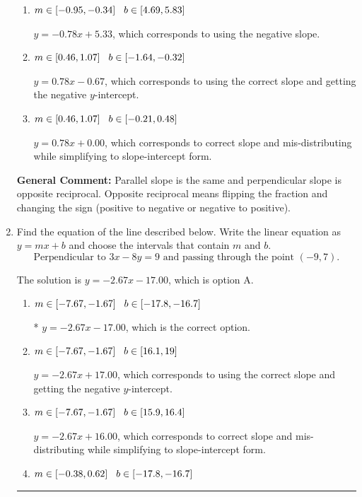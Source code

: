 \documentclass{extbook}[14pt]
\newcommand{\litem}[1]{\item #1

\rule{\textwidth}{0.4pt}}
\begin{document}
\begin{enumerate}
{\begin{enumerate}[label=\Alph*.]
 $y = 1.29x + 0.67$, which corresponds to using the reciprocal slope $(1/m)$.
\item \( m \in [-0.95, -0.34] \hspace*{3mm} b \in [4.69, 5.83] \)

 $y = -0.78x + 5.33$, which corresponds to using the negative slope.
\item \( m \in [0.46, 1.07] \hspace*{3mm} b \in [-1.64, -0.32] \)

 $y = 0.78x - 0.67$, which corresponds to using the correct slope and getting the negative $y$-intercept.
\item \( m \in [0.46, 1.07] \hspace*{3mm} b \in [-0.21, 0.48] \)

 $y = 0.78x + 0.00$, which corresponds to correct slope and mis-distributing while simplifying to slope-intercept form.
\end{enumerate}

\textbf{General Comment:} Parallel slope is the same and perpendicular slope is opposite reciprocal. Opposite reciprocal means flipping the fraction and changing the sign (positive to negative or negative to positive).
}
\litem{
Find the equation of the line described below. Write the linear equation as $ y=mx+b $ and choose the intervals that contain $m$ and $b$.
\[ \text{Perpendicular to } 3 x - 8 y = 9 \text{ and passing through the point } (-9, 7). \]

The solution is \( y = -2.67x - 17.00 \), which is option A.\begin{enumerate}[label=\Alph*.]
\item \( m \in [-7.67, -1.67] \hspace*{3mm} b \in [-17.8, -16.7] \)

* $y = -2.67x - 17.00$, which is the correct option.
\item \( m \in [-7.67, -1.67] \hspace*{3mm} b \in [16.1, 19] \)

 $y = -2.67x + 17.00$, which corresponds to using the correct slope and getting the negative $y$-intercept.
\item \( m \in [-7.67, -1.67] \hspace*{3mm} b \in [15.9, 16.4] \)

 $y = -2.67x + 16.00$, which corresponds to correct slope and mis-distributing while simplifying to slope-intercept form.
\item \( m \in [-0.38, 0.62] \hspace*{3mm} b \in [-17.8, -16.7] \)


\end{enumerate}}
\end{enumerate}
\end{document}
